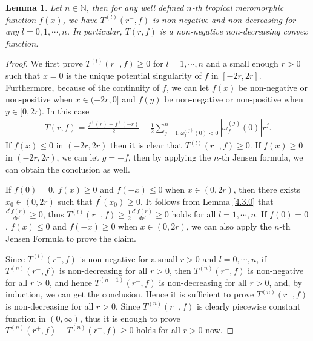 \documentclass{article}
\newtheorem{lemma}[defin]{Lemma}
\begin{document}
\begin{lemma}\label{lemma4.3}
    Let $n\in\mathbb{N}$, then for any well defined $n$-th tropical meromorphic function $f(x)$, we have $T^{(l)}(r^{-}, f)$ is non-negative and non-decreasing for any $l=0, 1, \cdots, n$. In particular, $T(r, f)$ is a non-negative non-decreasing convex function.
\end{lemma}
\begin{proof}

    We first prove $T^{(l)}(r^{-}, f)\geq 0$ for $l=1, \cdots, n$ and a small enough $r>0$ such that $x=0$ is the unique potential singularity of $f$ in $[-2r, 2r]$. Furthermore, because of the continuity of $f$, we can let $f(x)$ be non-negative or non-positive when $x\in(-2r, 0]$ and $f(y)$ be non-negative or non-positive when $y\in[0, 2r)$. In this case
    \begin{eqnarray*}
        T(r, f)=\frac{f^{+}(r)+f^{+}(-r)}{2}+\frac{1}{2}\sum_{j=1, \omega_{f}^{(j)}(0)<0}^{n}|\omega_{f}^{(j)}(0)|r^{j}.
    \end{eqnarray*}
    If $f(x)\leq 0$ in $(-2r, 2r)$ then it is clear that $T^{(l)}(r^{-}, f)\geq 0$. If $f(x)\geq 0$ in $(-2r, 2r)$, we can let $g=-f$, then by applying the $n$-th Jensen formula, we can obtain the conclusion as well. 
    
    If $f(0)=0$, $f(x)\geq 0$ and $f(-x)\leq 0$ when $x\in(0, 2r)$, then there exists $x_{0}\in(0, 2r)$ such that $f^{'}(x_{0})\geq 0$. It follows from Lemma \ref{4.3.0} that $\frac{d^{l}f(r)}{dr^{l}}\geq 0$, thus $T^{(l)}(r^{-}, f)\geq \frac{1}{2}\frac{d^{l}f(r)}{dr^{l}}\geq 0$ holds for all $l=1, \cdots, n$. If $f(0)=0$, $f(x)\leq 0$ and $f(-x)\geq 0$ when $x\in(0, 2r)$, we can also apply the $n$-th Jensen Formula to prove the claim.

    Since $T^{(l)}(r^{-}, f)$ is non-negative for a small $r>0$ and $l=0, \cdots, n$, if $T^{(n)}(r^{-}, f)$ is non-decreasing for all $r>0$, then $T^{(n)}(r^{-}, f)$ is non-negative for all $r>0$, and hence $T^{(n-1)}(r^{-}, f)$ is non-decreasing for all $r>0$, and, by induction, we can get the conclusion. Hence it is sufficient to prove $T^{(n)}(r^{-}, f)$ is non-decreasing for all $r>0$. Since $T^{(n)}(r^{-}, f)$ is clearly piecewise constant function in $(0, \infty)$, thus it is enough to prove $T^{(n)}(r^{+}, f)-T^{(n)}(r^{-}, f)\geq 0$ holds for all $r>0$ now. 
    

\end{proof}
\end{document}
